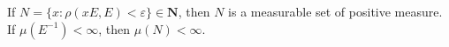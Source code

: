 If $N = \{x : \rho(xE, E) < \varepsilon\} \in \mathbf{N}$, then $N$ is a measurable set of positive measure. If $\mu(E^{-1}) < \infty$, then $\mu(N) < \infty$.